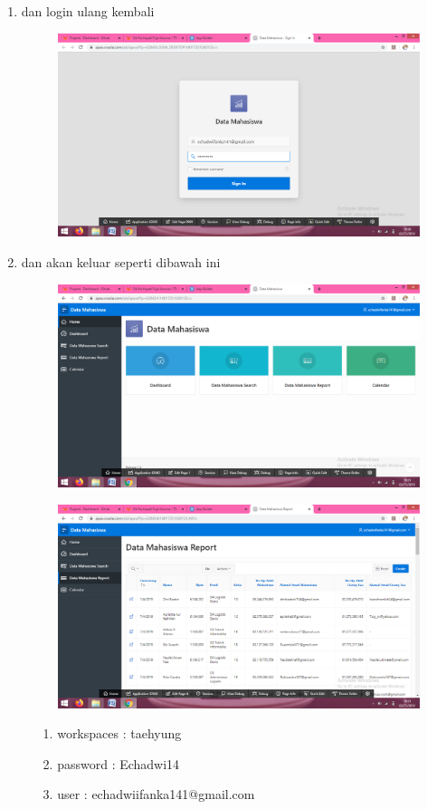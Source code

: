 \begin{enumerate}
	\item dan login ulang kembali 
	\begin{figure} [!htbp]
	\includegraphics[scale=0.2]{section/gambar/o.png}
	\centering
	\end{figure}
	
	\item dan akan keluar seperti dibawah ini
	\begin{figure} [!htbp]
	\includegraphics[scale=0.2]{section/gambar/p.png}
	\centering
	\end{figure}
	
	\begin{figure} [!htbp]
	\includegraphics[scale=0.2]{section/gambar/q.png}
	\centering
	\end{figure}
	
	\begin{enumerate}
	    \item[1.]workspaces : taehyung
	    \item[2.] password : Echadwi14
	    \item[3.] user : echadwiifanka141@gmail.com
	\end{enumerate}
\end{enumerate}
